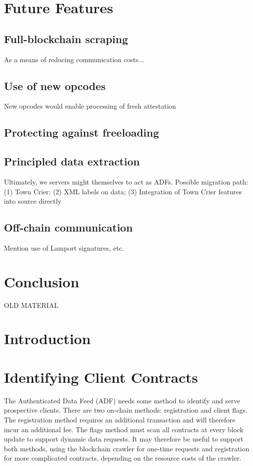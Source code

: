 \documentclass[letterpaper,twocolumn,10pt]{article}
\begin{document}
\section{Future Features}
\subsection{Full-blockchain scraping}
As a means of reducing communication costs...
\subsection{Use of new opcodes}
New opcodes would enable processing of fresh attestation
\subsection{Protecting against freeloading}
\subsection{Principled data extraction}
Ultimately, we servers might themselves to act as ADFs. Possible migration path: (1) Town Crier; (2) XML labels on data; (3) Integration of Town Crier features into source directly
\subsection{Off-chain communication}
Mention use of Lamport signatures, etc.

\section{Conclusion}
	
\pagebreak
\appendix 

OLD MATERIAL

\section{Introduction}

\section{Identifying Client Contracts}
The Authenticated Data Feed (ADF) needs some method to identify and serve prospective clients.  There are two on-chain methods: registration and client flags.  The registration method requires an additional transaction and will therefore incur an additional fee.  The flags method must scan all contracts at every block update to support dynamic data requests.  It may therefore be useful to support both methods, using the blockchain crawler for one-time requests and registration for more complicated contracts, depending on the resource costs of the crawler.
\end{document}
